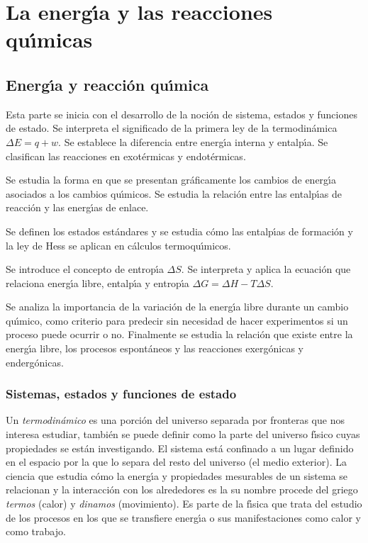 \chapter{La energ\'{\i}a y las reacciones qu\'{\i}micas}

\section{Energ\'{\i}a y reacci\'on qu\'{\i}mica}

Esta parte se inicia con el desarrollo de la noci\'on de sistema, estados y funciones de estado. Se interpreta el significado de la primera ley de la termodin\'amica $\Delta E = q + w$. Se establece la diferencia entre energ\'{\i}a interna y entalp\'{\i}a. Se clasifican las reacciones en exot\'ermicas y endot\'ermicas.

Se estudia la forma en que se presentan gr\'aficamente los cambios de energ\'{\i}a asociados a los cambios qu\'{\i}micos. Se estudia la relaci\'on entre las  entalp\'{\i}as de reacci\'on y las energ\'{\i}as de enlace. 

Se definen los estados est\'andares y se estudia c\'omo las entalp\'{\i}as de formaci\'on y la ley de Hess se aplican en c\'alculos termoqu\'{\i}micos.

Se introduce el concepto de entrop\'{\i}a $\Delta S$. Se interpreta y aplica la ecua\-ci\-\'on que relaciona energ\'{\i}a libre, entalp\'{\i}a y entrop\'{\i}a $\Delta G = \Delta H - T \Delta S$. 

Se analiza la importancia de la variaci\'on de la energ\'{\i}a libre durante un cambio qu\'{\i}mico, como criterio para predecir sin necesidad de hacer experimentos si un proceso puede ocurrir o no. Finalmente se estudia la relaci\'on que existe entre la energ\'{\i}a libre, los procesos espont\'aneos y las reacciones exerg\'onicas y enderg\'onicas.

\subsection{Sistemas, estados y funciones de estado}
 Un \textit{ termodin\'a\-mi\-co} es una porci\'on del universo separada por fronteras que nos interesa estudiar, tambi\'en se puede definir como la parte del universo f\'{\i}sico cuyas propiedades se est\'an investigando. El sistema est\'a confinado a un lugar definido en el espacio por la  que lo separa del resto del universo (el medio exterior). La ciencia que estudia c\'omo la energ\'{\i}a y propiedades mesurables de un sistema se relacionan y la interacci\'on con los alrededores es la \textbf{}  su nombre procede del griego \textit{termos} (calor) y \textit{dinamos} (movimiento). Es parte de la f\'{\i}sica que trata del estudio de los procesos en los que se transfiere energ\'{\i}a o sus manifestaciones como calor y como trabajo. 


